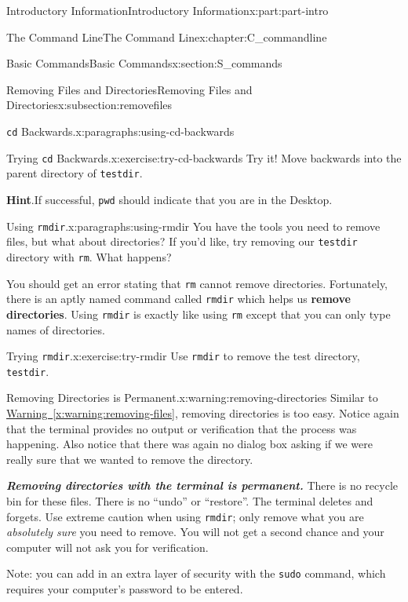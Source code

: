\documentclass[oneside,10pt,]{book}
\newcommand{\blocktitlefont}{\relax}
\newcommand{\xreffont}{\relax}
\newcommand{\mono}[1]{\texttt{#1}}
\newcommand{\alert}[1]{\textbf{\textit{#1}}}
\newcommand{\terminology}[1]{\textbf{#1}}
\begin{document}
\begin{partptx}{Introductory Information}{}{Introductory Information}{}{}{x:part:part-intro}
\begin{chapterptx}{The Command Line}{}{The Command Line}{}{}{x:chapter:C_commandline}
\begin{sectionptx}{Basic Commands}{}{Basic Commands}{}{}{x:section:S_commands}
\begin{subsectionptx}{Removing Files and Directories}{}{Removing Files and Directories}{}{}{x:subsection:removefiles}
\begin{paragraphs}{\mono{cd} Backwards.}{x:paragraphs:using-cd-backwards}
\begin{inlineexercise}{Trying \mono{cd} Backwards.}{x:exercise:try-cd-backwards}%
Try it! Move backwards into the parent directory of \mono{testdir}.%
\par\smallskip%
\noindent\textbf{\blocktitlefont Hint}.\hypertarget{g:hint:idm480467960}{}\quad{}If successful, \mono{pwd} should indicate that you are in the Desktop.%
\end{inlineexercise}%
\end{paragraphs}%
\begin{paragraphs}{Using \mono{rmdir}.}{x:paragraphs:using-rmdir}%
\index{\mono{rmdir}}%
%
\index{command line!\mono{rmdir}}%
You have the tools you need to remove files, but what about directories? If you'd like, try removing our \mono{testdir} directory with \mono{rm}. What happens?%
\par
You should get an error stating that \mono{rm} cannot remove directories. Fortunately, there is an aptly named command called \mono{rmdir} which helps us \terminology{remove directories}. Using \mono{rmdir} is exactly like using \mono{rm} except that you can only type names of directories.%
\begin{inlineexercise}{Trying \mono{rmdir}.}{x:exercise:try-rmdir}%
Use \mono{rmdir} to remove the test directory, \mono{testdir}.%
\end{inlineexercise}%
\begin{warning}{Removing Directories is Permanent.}{x:warning:removing-directories}%
%
Similar to \hyperref[x:warning:removing-files]{Warning~{\xreffont\ref{x:warning:removing-files}}}, removing directories is too easy. Notice again that the terminal provides no output or verification that the process was happening. Also notice that there was again no dialog box asking if we were really sure that we wanted to remove the directory.%
\par
\alert{Removing directories with the terminal is permanent.} There is no recycle bin for these files. There is no ``undo'' or ``restore''. The terminal deletes and forgets. Use extreme caution when using \mono{rmdir}; only remove what you are \emph{absolutely sure} you need to remove. You will not get a second chance and your computer will not ask you for verification.%
\par
Note: you can add in an extra layer of security with the \mono{sudo} command, which requires your computer's password to be entered.%
\end{warning}
\end{paragraphs}%

\end{subsectionptx}
\end{sectionptx}
\end{chapterptx}
\end{partptx}
\end{document}

